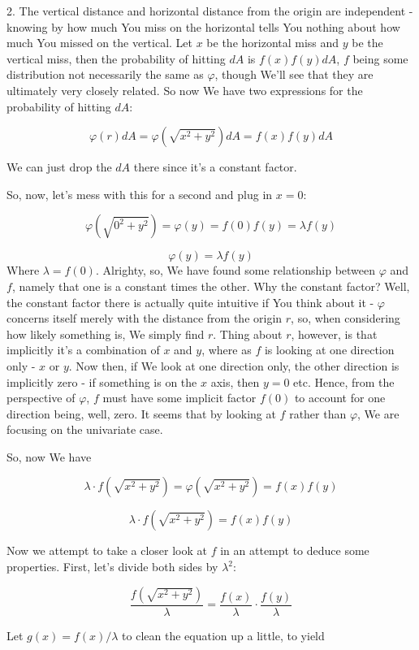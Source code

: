 \documentclass{article}
\begin{document}
		2. The vertical distance and horizontal distance from the origin are independent - knowing by how much You miss on the horizontal tells You nothing about how much You missed on the vertical. Let $x$ be the horizontal miss and $y$ be the vertical miss, then the probability of hitting $dA$ is $f(x)f(y)dA$, $f$ being some distribution not necessarily the same as $\varphi$, though We'll see that they are ultimately very closely related. So now We have two expressions for the probability of hitting $dA$:
		
		\[ \varphi(r)dA = \varphi(\sqrt{x^2+y^2})dA = f(x)f(y)dA \] 
		
		We can just drop the $dA$ there since it's a constant factor. 
		
		So, now, let's mess with this for a second and plug in $x=0$:
		
		\[\varphi(\sqrt{0^2 + y^2}) = \varphi(y) = f(0)f(y) = \lambda f(y) \]
		
		\[ \varphi(y) = \lambda f(y) \]
		Where $\lambda = f(0)$. Alrighty, so, We have found some relationship between $\varphi$ and $f$, namely that one is a constant times the other. Why the constant factor? Well, the constant factor there is actually quite intuitive if You think about it - $\varphi$ concerns itself merely with the distance from the origin $r$, so, when considering how likely something is, We simply find $r$. Thing about $r$, however, is that implicitly it's a combination of $x$ and $y$, where as $f$ is looking at one direction only - $x$ or $y$. Now then, if We look at one direction only, the other direction is implicitly zero - if something is on the $x$ axis, then $y=0$ etc. Hence, from the perspective of $\varphi$, $f$ must have some implicit factor $f(0)$ to account for one direction being, well, zero. It seems that by looking at $f$ rather than $\varphi$, We are focusing on the univariate case.
		
		So, now We have
		
		\[ \lambda\cdot f(\sqrt{x^2+y^2}) = \varphi(\sqrt{x^2+y^2}) = f(x)f(y) \]

		\[ \lambda\cdot f(\sqrt{x^2+y^2}) = f(x)f(y) \]
		
		Now we attempt to take a closer look at $f$ in an attempt to deduce some properties. First, let's divide both sides by $\lambda^2$:
		
		\[ \frac{f(\sqrt{x^2+y^2})}{\lambda} = \frac{f(x)}{\lambda}\cdot\frac{f(y)}{\lambda} \]
		
		Let $g(x) = f(x)/\lambda$ to clean the equation up a little, to yield
		
\end{document}
